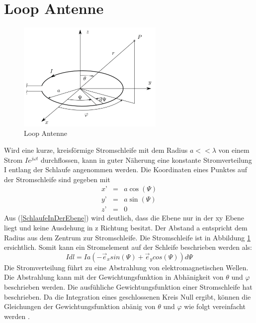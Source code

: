 
\section{Loop Antenne}\label{sec:LoopAntenneTheorie}
\begin{figure}[h]
	\centering
	\includegraphics[width=7cm]{content/bilder/Loop_EMANT_S45.pdf}%
	\caption{Loop Antenne}
	\label{LoopAntenne}
\end{figure}
Wird eine kurze, kreisförmige Stromschleife mit dem Radius $a<<\lambda$ von einem Strom $Ie^{j\omega t}$ durchflossen,  kann in guter Näherung eine konstante Stromverteilung I entlang der Schlaufe angenommen werden. Die Koordinaten eines Punktes auf der Stromschleife sind gegeben mit
\begin{eqnarray}
x’ &=& a \cos(\Psi)\\
y’ &=& a \sin(\Psi)\\
z’ &=& 0\label{SchlaufeInDerEbene}
\end{eqnarray}
Aus  (\ref{SchlaufeInDerEbene}) wird deutlich, dass die Ebene nur in der xy Ebene liegt und keine Ausdehung in z Richtung besitzt.
Der Abstand  a entspricht dem Radius  aus dem Zentrum zur Stromschleife. Die Stromschleife ist in  Abbildung \ref{LoopAntenne} ersichtlich. Somit kann ein Stromelement auf der Schleife beschrieben werden als:
\begin{equation}
I dl= Ia(- \vec e_{x}sin(\Psi)+\vec e_{y}cos(\Psi))d\Psi
\end{equation}
Die Stromverteilung führt zu eine Abstrahlung von elektromagnetischen Wellen. Die Abstrahlung kann mit der Gewichtungsfunktion in Abhänigkeit von $\theta$ und $\varphi$ beschrieben werden. Die ausfühliche Gewichtungsfunktion einer Stromschleife hat  \cite{elliott1981antenna}beschrieben. Da die Integration eines geschlossenen Kreis Null ergibt, können die Gleichungen der Gewichtungsfunktion abänig von $\theta$ und $\varphi$ wie folgt vereinfacht werden \cite{Emant}.
